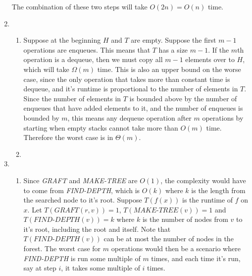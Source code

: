 \documentclass[letterpaper,10pt]{article}
\begin{document}
\begin{enumerate}
  The combination of these two steps will take $O(2n) = O(n)$ time.

  \clearpage
  \item

  \begin{enumerate}
    \item Suppose at the beginning $H$ and $T$ are empty. Suppose the first $m-1$ operations are enqueues. This means that $T$ has a size $m-1$. If the $m$th operation is a dequeue, then we must copy all $m-1$ elements over to $H$, which will take $\Omega(m)$ time. This is also an upper bound on the worse case, since the only operation that takes more than constant time is dequeue, and it's runtime is proportional to the number of elements in $T$. Since the number of elements in $T$ is bounded above by the number of enqueues that have added elements to it, and the number of enqueues is bounded by $m$, this means any dequeue operation after $m$ operations by starting when empty stacks cannot take more than $O(m)$ time. Therefore the worst case is in $\Theta(m)$.
    \item 
  \end{enumerate}

  \clearpage
  \item

  \begin{enumerate}
    \item Since \textit{GRAFT} and \textit{MAKE-TREE} are $O(1)$, the complexity would have to come from \textit{FIND-DEPTH}, which is $O(k)$ where $k$ is the length from the searched node to it's root. Suppose $T(f(x))$ is the runtime of $f$ on $x$. Let $T(\textit{GRAFT}(r, v)) = 1$, $T(\textit{MAKE-TREE}(v)) = 1$ and $T(\textit{FIND-DEPTH}(v)) = k$ where $k$ is the number of nodes from $v$ to it's root, including the root and itself. Note that $T(\textit{FIND-DEPTH}(v))$ can be at most the number of nodes in the forest. The worst case for $m$ operations would then be a scenario where \textit{FIND-DEPTH} is run some multiple of $m$ times, and each time it's run, say at step $i$, it takes some multiple of $i$ times. 


\end{enumerate}
\end{enumerate}
\end{document}
